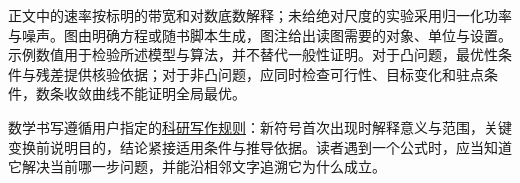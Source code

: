 正文中的速率按标明的带宽和对数底数解释；未给绝对尺度的实验采用归一化功率与噪声。图由明确方程或随书脚本生成，图注给出读图需要的对象、单位与设置。示例数值用于检验所述模型与算法，并不替代一般性证明。对于凸问题，最优性条件与残差提供核验依据；对于非凸问题，应同时检查可行性、目标变化和驻点条件，数条收敛曲线不能证明全局最优。

数学书写遵循用户指定的\href{https://github.com/hongjinrui/writing_skills/blob/main/SKILL.md}{科研写作规则}\cite{writing2026}：新符号首次出现时解释意义与范围，关键变换前说明目的，结论紧接适用条件与推导依据。读者遇到一个公式时，应当知道它解决当前哪一步问题，并能沿相邻文字追溯它为什么成立。
